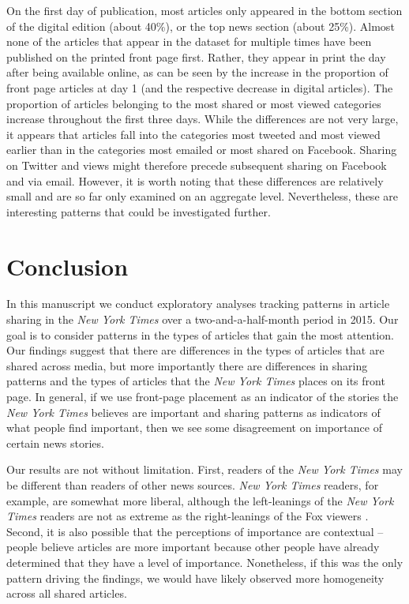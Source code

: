 \documentclass[12pt]{article}
\begin{document}
\begin{doublespace}
On the first day of publication, most articles only appeared in the bottom section of the digital edition (about 40\%), or the top news section (about 25\%). Almost none of the articles that appear in the dataset for multiple times have been published on the printed front page first. Rather, they appear in print the day after being available online, as can be seen by the increase in the proportion of front page articles at day 1 (and the respective decrease in digital articles). The proportion of articles belonging to the most shared or most viewed categories increase throughout the first three days. While the differences are not very large, it appears that articles fall into the categories most tweeted and most viewed earlier than in the categories most emailed or most shared on Facebook. Sharing on Twitter and views might therefore precede subsequent sharing on Facebook and via email. However, it is worth noting that these differences are relatively small and are so far only examined on an aggregate level. Nevertheless, these are interesting patterns that could be investigated further.


\section{Conclusion}

In this manuscript we conduct exploratory analyses tracking patterns in article sharing in the \textit{New York Times} over a two-and-a-half-month period in 2015.  Our goal is to consider patterns in the types of articles that gain the most attention. Our findings suggest that there are differences in the types of articles that are shared across media, but more importantly there are differences in sharing patterns and the types of articles that the \textit{New York Times} places on its front page. In general, if we use front-page placement as an indicator of the stories the \textit{New York Times} believes are important and sharing patterns as indicators of what people find important, then we see some disagreement on importance of certain news stories.

Our results are not without limitation. First, readers of the \textit{New York Times} may be different than readers of other news sources. \textit{New York Times} readers, for example, are somewhat more liberal, although the left-leanings of the \textit{New York Times} readers are not as extreme as the right-leanings of the Fox viewers \citep{GolbeckHansen2014}. Second, it is also possible that the perceptions of importance are contextual -- people believe articles are more important because other people have already determined that they have a level of importance. Nonetheless, if this was the only pattern driving the findings, we would have likely observed more homogeneity across all shared articles.


\end{doublespace}
\end{document}
